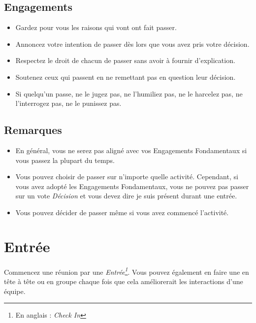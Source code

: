 \documentclass[paper=6in:9in,pagesize=pdftex,headinclude=on,footinclude=on,12pt]{scrbook}
\begin{document}
\subsection{Engagements}
\begin{itemize}
	\item Gardez pour vous les raisons qui vont ont fait passer.
	\item Annoncez votre intention de passer dès lors que vous avez pris votre décision.
	\item Respectez le droit de chacun de passer sans avoir à fournir d'explication.
	\item Soutenez ceux qui passent en ne remettant pas en question leur décision.
	\item Si quelqu'un passe, ne le jugez pas, ne l'humiliez pas, ne le harcelez pas, ne l'interrogez pas, ne le punissez pas.
\end{itemize}

\subsection{Remarques}
\begin{itemize}
	\item En général, vous ne serez pas aligné avec vos Engagements Fondamentaux si vous passez la plupart du temps.
	\item Vous pouvez choisir de passer sur n'importe quelle activité. Cependant, si vous avez adopté les Engagements
	      Fondamentaux, vous ne pouvez pas passer sur un vote \emph{Décision} et vous devez dire \og{}je suis présent\fg{}
	      durant une entrée.
	\item Vous pouvez décider de passer même si vous avez commencé l'activité.
\end{itemize}

\section{Entrée} \label{protocole-entree}

Commencez une réunion par une \emph{Entrée\footnote{En anglais : \emph{Check In}}}.
Vous pouvez également en faire une en tête à tête ou en groupe chaque fois que
cela améliorerait les interactions d'une équipe.
\end{document}
